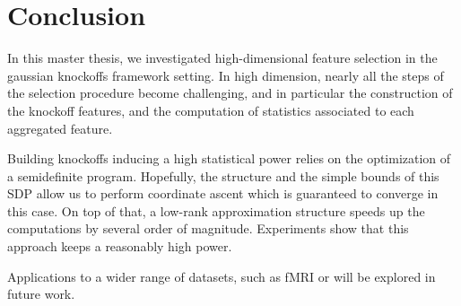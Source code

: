 \cleardoublepage
\chapter*{Conclusion}

In this master thesis,
we investigated high-dimensional feature selection
in the gaussian knockoffs framework setting.
In high dimension, nearly all the steps of the selection procedure become challenging,
and in particular the construction of the knockoff features,
and the computation of statistics associated to each aggregated feature.

Building knockoffs inducing a high statistical power relies on the optimization of a semidefinite program.
Hopefully, the structure and the simple bounds of this SDP allow us to perform coordinate ascent which
is guaranteed to converge in this case.
On top of that, a low-rank approximation structure speeds up the computations by several order of magnitude.
Experiments show that this approach keeps a reasonably high power.

Applications to a wider range of datasets, such as fMRI or will be explored in future work.
